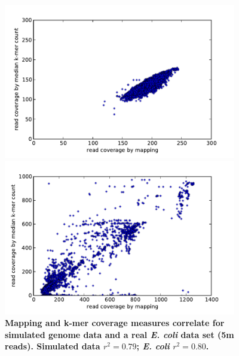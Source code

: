 \documentclass[10pt]{article}
\begin{document}
\begin{figure}[!ht]
\begin{center}
\centerline{\includegraphics[width=4in]{diginorm-sim-genome.pdf}}
\centerline{\includegraphics[width=4in]{diginorm-ecoli-genome.pdf}}
\end{center}
\caption{
{\bf Mapping and k-mer coverage measures correlate for simulated genome
data and a real {\em E. coli} data set (5m reads).  Simulated data $r^2 = 0.79$; {\em
E. coli} $r^2 = 0.80$.}
}
\label{fig:random}
\end{figure}
\end{document}
